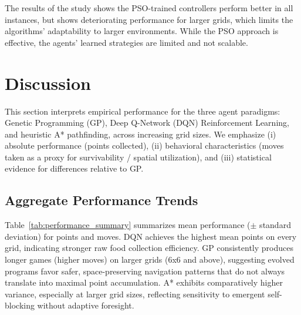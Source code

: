 \documentclass[a4paper,12pt]{article}
\begin{document}
The results of the study shows the PSO-trained controllers perform better in all instances, but shows deteriorating performance for larger grids, which limits the algorithms' adaptability to larger environments.
While the PSO approach is effective, the agents' learned strategies are limited and not scalable.

\section{Discussion}

This section interprets empirical performance for the three agent paradigms: Genetic Programming (GP), Deep Q-Network (DQN) Reinforcement Learning, and heuristic A* pathfinding, across increasing grid sizes. We emphasize (i) absolute performance (points collected), (ii) behavioral characteristics (moves taken as a proxy for survivability / spatial utilization), and (iii) statistical evidence for differences relative to GP.

\subsection{Aggregate Performance Trends}
Table~\ref{tab:performance_summary} summarizes mean performance ($\pm$ standard deviation) for points and moves. DQN achieves the highest mean points on every grid, indicating stronger raw food collection efficiency. GP consistently produces longer games (higher moves) on larger grids (6x6 and above), suggesting evolved programs favor safer, space-preserving navigation patterns that do not always translate into maximal point accumulation. A* exhibits comparatively higher variance, especially at larger grid sizes, reflecting sensitivity to emergent self-blocking without adaptive foresight.
\end{document}
